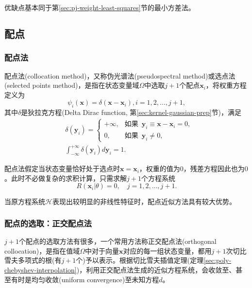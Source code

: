 优缺点基本同于第\ref{sec:pj-weight-least-squares}节的最小方差法。

\subsection{配点}
\label{sec:pj-weight-collocation}
\subsubsection{配点法}
\label{sec:pj-weight-collocation-method}
配点法(collocation method)，又称伪光谱法(pseudospectral method)或选点法(selected points method)，是指在状态变量域$\Omega$中选取$j+1$个配点$\bm{x}_i$，将权重方程定义为
\begin{equation*}
  \psi_i(\bm{x}) = \delta(\bm{x} - \bm{x}_i), i=1,2,\ldots,j+1,
\end{equation*}
其中$\delta$是狄拉克方程(Delta Dirac function, 第\ref{sec:kernel-gaussian-prep}节)，满足
\begin{equation*}
  \begin{split}
    &\delta(\bm{y}_i) = \begin{cases}
    +\infty, &\text{如果 }\, \bm{y}_i \equiv \bm{x} - \bm{x}_i =0,\\
     0, &\text{如果 }\, \bm{y}_i \neq 0,
    \end{cases} \\
    &\int_{-\infty}^{+\infty} \delta(\bm{y}_i) d \bm{y}_i
 = 1.
  \end{split}
\end{equation*}

配点法假定当状态变量恰好处于选点时$\bm{x} = \bm{x}_i$，权重的值为$0$，残差方程因此也为$0$。此时不必做复杂的求积计算，只需求解$j+1$个方程系统
\begin{equation*}
  R\left( \bm{x}_i | \theta \right) =0, \quad j=1,2,\ldots,j+1.
\end{equation*}

当原方程系统$\mathcal{H}$表现出较明显的非线性特征时，配点近似方法具有较大优势。

\subsubsection{配点的选取：正交配点法}
\label{sec:pj-weight-collocation-orthogonal}

$j+1$个配点的选取方法有很多，一个常用方法称正交配点法(orthogonal collocation)，是指在值域$\Omega$中对于向量$\bm{x}$对应的每一组状态变量，都用$j+1$次切比雪夫多项式的根(有$j+1$个)予以表示。根据切比雪夫插值定理(定理\ref{sec:poly-chebyshev-interpolation})，利用正交配点法生成的近似方程系统，会收敛至、甚至有时是均匀收敛(uniform convergence)至未知方程$d$。

